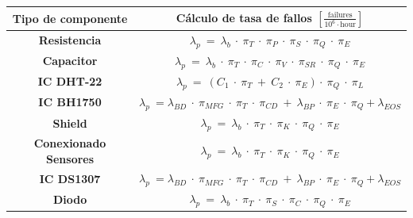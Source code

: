 \begin{table}[H]
\centering
\begin{tabular}{cc}
\hline
\multicolumn{1}{|c|}{\textbf{Tipo de componente}}                & \multicolumn{1}{c|}{\textbf{Cálculo de tasa de fallos $\left[\frac{\text{failures}}{10^6 \cdot \text{hour}}\right]$}}                                                       \\ \hline
\multicolumn{1}{|c|}{\textbf{Resistencia}}                       & \multicolumn{1}{c|}{$\lambda_p \ = \ \lambda_b \ \cdot \  \pi_T \ \cdot \ \pi_P \ \cdot \ \pi_S \ \cdot \ \pi_Q \ \cdot \ \pi_E$}                                           \\ \hline
\multicolumn{1}{|c|}{\textbf{Capacitor}}                         & \multicolumn{1}{c|}{$\lambda_p \ = \ \lambda_b \ \cdot \  \pi_T \ \cdot \ \pi_C \ \cdot \ \pi_V \ \cdot \ \pi_{SR} \ \cdot \ \pi_Q \ \cdot \ \pi_E  $}                      \\ \hline
\multicolumn{1}{|c|}{\textbf{IC DHT-22}}                         & \multicolumn{1}{c|}{$\lambda_p \ = \  (C_1 \ \cdot \ \pi_T \ + \ C_2 \ \cdot \ \pi_E ) \cdot \ \pi_Q \ \cdot \ \pi_L  $}                                                    \\ \hline
\multicolumn{1}{|c|}{\cellcolor[HTML]{FFFFFF}\textbf{IC BH1750}} & \multicolumn{1}{c|}{$\lambda_p \ = \lambda_{BD} \ \cdot \ \pi_{MFG} \ \cdot \ \pi_T \ \cdot \ \pi_{CD} \ + \ \lambda_{BP} \ \cdot \ \pi_E \ \cdot \ \pi_Q + \lambda_{EOS}$} \\ \hline
\multicolumn{1}{|c|}{\textbf{Shield}}                            & \multicolumn{1}{c|}{$\lambda_p \ = \ \lambda_b \ \cdot \  \pi_T \ \cdot \ \pi_K  \ \cdot \ \pi_Q \ \cdot \ \pi_E $}                                                         \\ \hline
\multicolumn{1}{|c|}{\textbf{Conexionado Sensores}}              & \multicolumn{1}{c|}{$\lambda_p \ = \ \lambda_b \ \cdot \  \pi_T \ \cdot \ \pi_K  \ \cdot \ \pi_Q \ \cdot \ \pi_E $}                                                         \\ \hline
\multicolumn{1}{|c|}{\textbf{IC DS1307}}                         & \multicolumn{1}{c|}{$\lambda_p \ = \lambda_{BD} \ \cdot \ \pi_{MFG} \ \cdot \ \pi_T \ \cdot \ \pi_{CD} \ + \ \lambda_{BP} \ \cdot \ \pi_E \ \cdot \ \pi_Q + \lambda_{EOS}$} \\ \hline
\multicolumn{1}{|c|}{\textbf{Diodo}}                             & \multicolumn{1}{c|}{$\lambda_p \ = \ \lambda_b \ \cdot \  \pi_T \ \cdot \ \pi_S  \ \cdot \ \pi_C \ \cdot \ \pi_Q \ \cdot \ \pi_E $}                                         \\ \hline

\end{tabular}
\end{table}
